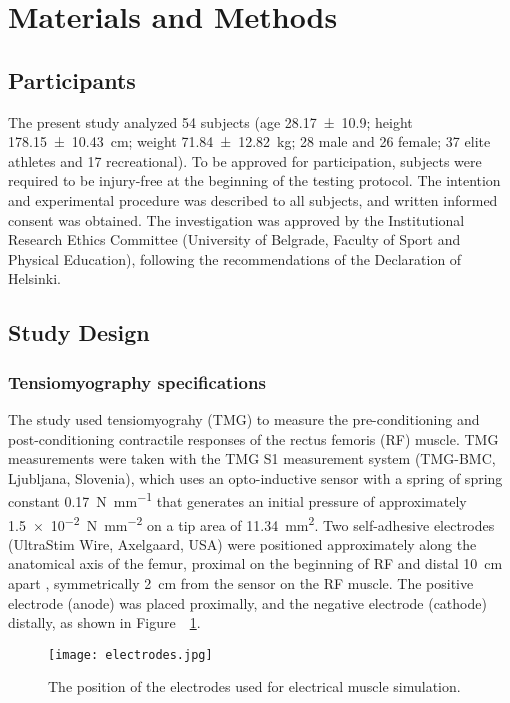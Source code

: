 \documentclass[utf8]{FrontiersinHarvard}
\begin{document}
\section{Materials and Methods}
\subsection{Participants}
The present study analyzed 54 subjects (age \SI{28.17 \pm 10.9}{\year}; height \SI{178.15 \pm 10.43}{\centi \meter}; weight \SI{71.84 \pm 12.82}{\kilogram}; 28 male and 26 female; 37 elite athletes and 17 recreational).
To be approved for participation, subjects were required to be injury-free at the beginning of the testing protocol.
The intention and experimental procedure was described to all subjects, and written informed consent was obtained.
The investigation was approved by the Institutional Research Ethics Committee (University of Belgrade, Faculty of Sport and Physical Education), following the recommendations of the Declaration of Helsinki.

\subsection{Study Design}

\subsubsection{Tensiomyography specifications}
The study used tensiomyograhy (TMG) to measure the pre-conditioning and post-conditioning contractile responses of the rectus femoris (RF) muscle.
TMG measurements were taken with the TMG S1 measurement system (TMG-BMC, Ljubljana, Slovenia), which uses an opto-inductive sensor with a spring of spring constant \SI{0.17}{\newton \per \milli \meter} that generates an initial pressure of approximately \SI{1.5e-2}{\newton \per \milli \meter \squared} on a tip area of \SI{11.34}{\milli \meter \squared}.
Two self-adhesive electrodes (UltraStim\textregistered{} Wire, Axelgaard, USA) were positioned approximately along the anatomical axis of the femur, proximal on the beginning of RF and distal \SI{10}{\centi \meter} apart \citep{maffulietti}, symmetrically \SI{2}{\centi \meter} from the sensor on the RF muscle.
The positive electrode (anode) was placed proximally, and the negative electrode (cathode) distally, as shown in Figure~~\ref{fig:electrodes}.

\begin{figure}
	\centering
    \texttt{[image: electrodes.jpg]}
    \caption{The position of the electrodes used for electrical muscle simulation.}
    \label{fig:electrodes}
\end{figure}
\end{document}
